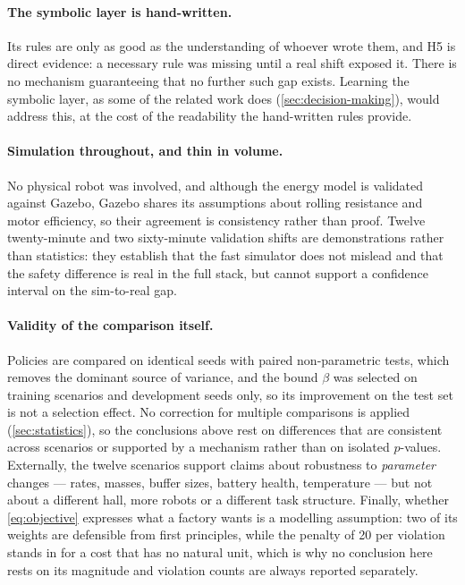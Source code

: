 \paragraph{The symbolic layer is hand-written.}
Its rules are only as good as the understanding of whoever wrote them, and H5 is direct evidence:
a necessary rule was missing until a real shift exposed it. There is no mechanism guaranteeing that
no further such gap exists. Learning the symbolic layer, as some of the related work does
(\cref{sec:decision-making}), would address this, at the cost of the readability the hand-written
rules provide.

\paragraph{Simulation throughout, and thin in volume.}
No physical robot was involved, and although the energy model is validated against Gazebo, Gazebo
shares its assumptions about rolling resistance and motor efficiency, so their agreement is
consistency rather than proof. Twelve twenty-minute and two sixty-minute validation shifts are
demonstrations rather than statistics: they establish that the fast simulator does not mislead and
that the safety difference is real in the full stack, but cannot support a confidence interval on
the sim-to-real gap.

\paragraph{Validity of the comparison itself.}
Policies are compared on identical seeds with paired non-parametric tests, which removes the
dominant source of variance, and the bound $\beta$ was selected on training scenarios and
development seeds only, so its improvement on the test set is not a selection effect. No correction
for multiple comparisons is applied (\cref{sec:statistics}), so the conclusions above rest on
differences that are consistent across scenarios or supported by a mechanism rather than on
isolated $p$-values. Externally, the twelve scenarios support claims about robustness to
\emph{parameter} changes --- rates, masses, buffer sizes, battery health, temperature --- but not
about a different hall, more robots or a different task structure. Finally, whether
\cref{eq:objective} expresses what a factory wants is a modelling assumption: two of its weights
are defensible from first principles, while the penalty of \num{20} per violation stands in for a
cost that has no natural unit, which is why no conclusion here rests on its magnitude and violation
counts are always reported separately.
